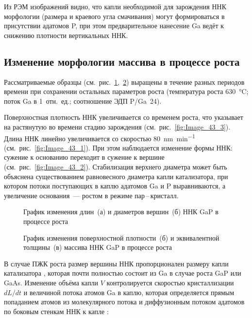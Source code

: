 Из РЭМ изображений видно, что капли необходимой для зарождения ННК морфологии
(размера и краевого угла смачивания) могут формироваться в присутствии адатомов
P, при этом предварительное нанесение Ga ведёт к снижению плотности
вертикальных ННК.

\subsection{Изменение морфологии массива в процессе
роста}\label{subsec:ch6/sec2/sub2}

Рассматриваемые образцы
(см.~рис.~\cref{fig:Image_43_12},~\cref{fig:Image_43_34}) выращены в течение
разных периодов времени при сохранении остальных параметров роста (температура
роста 630~\si{\degreeCelsius}; поток Ga в 1~отн.~ед.; соотношение ЭДП P/Ga~24).

Поверхностная плотность ННК увеличивается со временем роста, что указывает на растянутую во времени стадию
зарождения (см.~рис.~\cref{fig:Image_43_3}).
Длина ННК линейно увеличивается со скоростью
80~\si{\nano\meter\per\minute} (см.~рис.~\cref{fig:Image_43_1}). При этом
наблюдается изменение формы ННК: сужение к основанию переходит в сужение к
вершине (см.~рис.~\cref{fig:Image_43_2}). Стабилизация верхнего диаметра может
быть объяснена существованием равновесного диаметра капли катализатора, при
котором потоки поступающих в каплю адатомов Ga и P выравниваются, а увеличение
основания~--- ростом в режиме пар\,--\,кристалл.

\begin{figure}[ht] 
\caption{График изменения длин~(а) и диаметров вершин~(б) ННК GaP в процессе роста}
\label{fig:Image_43_12}
\end{figure}

\begin{figure}[ht] 
\caption{График изменения поверхностной плотности~(б) и эквивалентной толщины~(в) массива ННК
GaP в процессе роста}
\label{fig:Image_43_34}
\end{figure}

В случае ПЖК роста размер вершины ННК пропорционален размеру капли катализатора
\cite{glas2010vapor}, которая почти полностью состоит из Ga в случае роста GaP
или GaAs. Изменение объёма капли \(V\) контролируется скоростью кристаллизации
\(dL/dt\) и величиной потока атомов Ga в каплю, которая определяется прямым
попаданием атомов из молекулярного потока и диффузионным потоком адатомов по
боковым стенкам ННК к капле \cite{glas2010vapor}:

